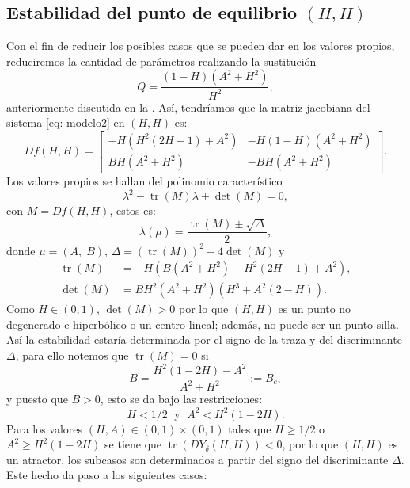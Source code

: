 \subsection{Estabilidad del punto de equilibrio $(H,H)$}
\label{sec: HH}
Con el fin de reducir los posibles casos que se pueden dar en los valores propios, reduciremos la cantidad de parámetros realizando la sustitución
\begin{equation}
	Q=\dfrac{(1-H)(A^2+H^{2})}{H^{2}},
	\label{eq: Q}
\end{equation}
anteriormente discutida en la . Así, tendríamos que la matriz jacobiana del sistema \eqref{eq: modelo2} en $(H,H)$ es:
\begin{equation}
	Df(H,H) =
	\begin{bmatrix}
		-H(H^{2}(2H-1)+A^2) & -H(1-H)(A^2+H^2) \\
		BH(A^{2}+H^{2}) & -BH(A^{2}+H^{2})
	\end{bmatrix}.
	\label{eq:jacobianaModelo2En(H,H)}
\end{equation}
Los valores propios se hallan del polinomio característico $$\lambda^2 - \operatorname{tr}(M) \lambda + \det(M) = 0,$$ con $M = Df(H,H)$, estos es:
\begin{equation*}
	\lambda(\mu) = \dfrac{\operatorname{tr}(M) \pm \sqrt{\Delta}}{2},
\end{equation*}
donde $\mu = (A, \; B)$, $\Delta = (\operatorname{tr}(M))^2 - 4\det(M)$ y
\begin{equation*}
	\begin{aligned}
		\operatorname{tr}(M) &= -H(B(A^{2}+H^{2})+H^{2}(2H-1)+A^2), \\
		\det(M) &= BH^2(A^2+H^2)(H^3+A^2(2-H)).
	\end{aligned}
\end{equation*}
Como $H \in (0, 1)$, $\det(M)>0$ por lo que $(H,H)$ es un punto no degenerado e hiperbólico o un centro lineal; además, no puede ser un punto silla. Así la estabilidad estaría determinada por el signo de la traza y del discriminante $\Delta$, para ello notemos que $\operatorname{tr}(M)=0$ si
\begin{equation}
	B = \dfrac{H^2(1-2H) - A^2}{A^2 + H^2} := B_c,
	\label{eq: Bcritico}
\end{equation}
y puesto que $B>0$, esto se da bajo las restricciones: $$H<1/2 \; \text{ y } \; A^2 < H^2(1-2H).$$ Para los valores $(H, A) \in (0, 1) \times (0, 1)$ tales que $H \geq 1/2$ o $A^2 \geq H^2(1-2H)$ se tiene que $\operatorname{tr}(DY_\delta(H,H)) < 0$, por lo que $(H, H)$ es un atractor, los subcasos son determinados a partir del signo del discriminante $\Delta$. Este hecho da paso a los siguientes casos:
